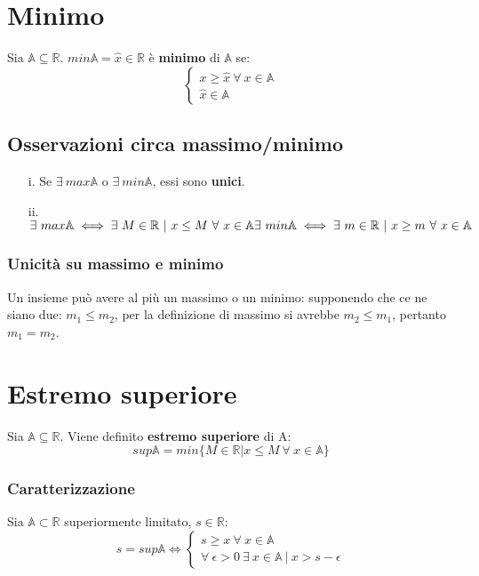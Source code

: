 \section{Minimo}
Sia $\mathbb{A} \subseteq \mathbb{R}$. $min\mathbb{A}=\hat{x} \in \mathbb{R}$ è \textbf{minimo} di $\mathbb{A}$ se:
\begin{equation}
\begin{cases}
x \geq \hat{x}\ \forall\ x \in \mathbb{A}\\
\hat{x} \in \mathbb{A}
\end{cases}
\end{equation}
\subsection{Osservazioni circa massimo/minimo}
\begin{enumerate}
\item [i.] Se $\exists\ max\mathbb{A}$ o $\exists\ min\mathbb{A}$, essi sono \textbf{unici}.
\item [ii.] $\exists\ max\mathbb{A} \iff \exists\ M \in \mathbb{R}\ |\ x \leq M\ \forall\ x \in \mathbb{A}\\
\exists\ min\mathbb{A} \iff \exists\ m \in \mathbb{R}\ |\ x \geq m\ \forall\ x \in \mathbb{A}$
\end{enumerate}
\subsubsection{Unicit\`a su massimo e minimo}
Un insieme pu\`o avere al pi\`u un massimo o un minimo: supponendo che ce ne siano due: $m_1 \le m_2$, per la definizione di massimo si avrebbe $m_2 \le m_1$, pertanto
$m_1 = m_2$.
\section{Estremo superiore}
Sia $\mathbb{A} \subseteq \mathbb{R}$. Viene definito \textbf{estremo superiore} di A:
\begin{equation}
sup\mathbb{A} = min\{M \in \mathbb{R} | x \leq M\ \forall\ x \in \mathbb{A}\}
\end{equation}
\subsubsection{Caratterizzazione}
Sia $\mathbb{A} \subset \mathbb{R}$ superiormente limitato, $s \in \mathbb{R}$:\\
\begin{equation}
	s=sup\mathbb{A} \iff
	\begin{cases}
	s \geq x\ \forall\ x \in \mathbb{A}\\
	\forall\ \epsilon > 0\ \exists\ x \in \mathbb{A}\ |\ x > s-\epsilon
	\end{cases}
\end{equation}
